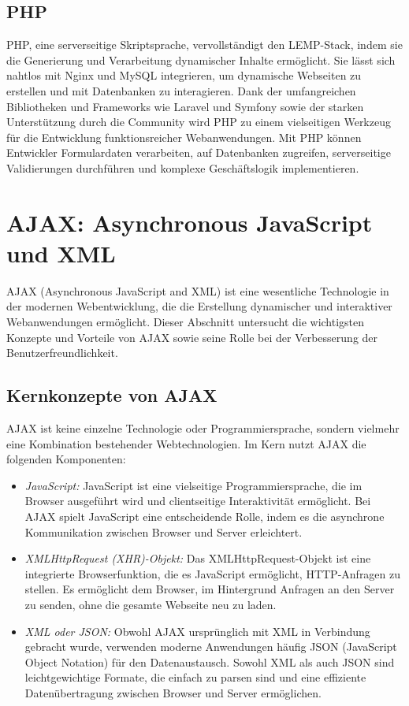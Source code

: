\subsection{PHP}
PHP, eine serverseitige Skriptsprache, vervollständigt den LEMP-Stack, indem sie die Generierung und Verarbeitung dynamischer Inhalte ermöglicht. Sie lässt sich nahtlos mit Nginx und MySQL integrieren, um dynamische Webseiten zu erstellen und mit Datenbanken zu interagieren. Dank der umfangreichen Bibliotheken und Frameworks wie Laravel und Symfony sowie der starken Unterstützung durch die Community wird PHP zu einem vielseitigen Werkzeug für die Entwicklung funktionsreicher Webanwendungen. Mit PHP können Entwickler Formulardaten verarbeiten, auf Datenbanken zugreifen, serverseitige Validierungen durchführen und komplexe Geschäftslogik implementieren.

\section{AJAX: Asynchronous JavaScript und XML}

AJAX\cite{riordan2008head} (Asynchronous JavaScript and XML) ist eine wesentliche Technologie in der modernen Webentwicklung, die die Erstellung dynamischer und interaktiver Webanwendungen ermöglicht. Dieser Abschnitt untersucht die wichtigsten Konzepte und Vorteile von AJAX sowie seine Rolle bei der Verbesserung der Benutzerfreundlichkeit.

\subsection{Kernkonzepte von AJAX}
AJAX ist keine einzelne Technologie oder Programmiersprache, sondern vielmehr eine Kombination bestehender Webtechnologien. Im Kern nutzt AJAX die folgenden Komponenten:
\begin{itemize}
    \item \emph{JavaScript:} JavaScript ist eine vielseitige Programmiersprache, die im Browser ausgeführt wird und clientseitige Interaktivität ermöglicht. Bei AJAX spielt JavaScript eine entscheidende Rolle, indem es die asynchrone Kommunikation zwischen Browser und Server erleichtert.
    \item \emph{XMLHttpRequest (XHR)-Objekt:} Das XMLHttpRequest-Objekt ist eine integrierte Browserfunktion, die es JavaScript ermöglicht, HTTP-Anfragen zu stellen. Es ermöglicht dem Browser, im Hintergrund Anfragen an den Server zu senden, ohne die gesamte Webseite neu zu laden.
    \item \emph{XML oder JSON:} Obwohl AJAX ursprünglich mit XML in Verbindung gebracht wurde, verwenden moderne Anwendungen häufig JSON (JavaScript Object Notation) für den Datenaustausch. Sowohl XML als auch JSON sind leichtgewichtige Formate, die einfach zu parsen sind und eine effiziente Datenübertragung zwischen Browser und Server ermöglichen.
\end{itemize}

